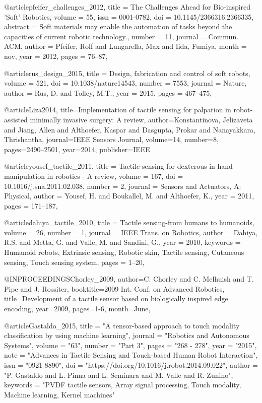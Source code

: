 @article{pfeifer_challenges_2012,
	title = {The {Challenges} {Ahead} for {Bio}-inspired '{Soft}' {Robotics}},
	volume = {55},
	issn = {0001-0782},
	doi = {10.1145/2366316.2366335},
	abstract = {Soft materials may enable the automation of tasks beyond the capacities of current robotic technology.},
	number = {11},
	journal = {Commun. ACM},
	author = {Pfeifer, Rolf and Lungarella, Max and Iida, Fumiya},
	month = nov,
	year = {2012},
	pages = {76--87},
}


@article{rus_design_2015,
	title = {Design, fabrication and control of soft robots},
	volume = {521},
	doi = {10.1038/nature14543},
	number = {7553},
	journal = {Nature},
	author = {Rus, D. and Tolley, M.T.},
	year = {2015},
	pages = {467--475},
}

@article{Liza2014,
  title={Implementation of tactile sensing for palpation in robot-assisted minimally invasive surgery: A review},
  author={Konstantinova, Jelizaveta and Jiang, Allen and Althoefer, Kaspar and Dasgupta, Prokar and Nanayakkara, Thrishantha},
  journal={IEEE Sensors Journal},
  volume={14},
  number={8},
  pages={2490--2501},
  year={2014},
  publisher={IEEE}
}


@article{yousef_tactile_2011,
	title = {Tactile sensing for dexterous in-hand manipulation in robotics - {A} review},
	volume = {167},
	doi = {10.1016/j.sna.2011.02.038},
	number = {2},
	journal = {Sensors and Actuators, A: Physical},
	author = {Yousef, H. and Boukallel, M. and Althoefer, K.},
	year = {2011},
	pages = {171--187},
}


@article{dahiya_tactile_2010,
	title = {Tactile sensing-from humans to humanoids},
	volume = {26},
	number = {1},
	journal = {IEEE Trans. on Robotics},
	author = {Dahiya, R.S. and Metta, G. and Valle, M. and Sandini, G.},
	year = {2010},
	keywords = {Humanoid robots, Extrinsic sensing, Robotic skin, Tactile sensing, Cutaneous sensing, Touch sensing system},
	pages = {1--20},
}


@INPROCEEDINGS{Chorley_2009, 
	author={C. Chorley and C. Melhuish and T. Pipe and J. Rossiter}, 
	booktitle={2009 Int. Conf. on Advanced Robotics}, 
	title={Development of a tactile sensor based on biologically inspired edge encoding}, 
	year={2009}, 
	pages={1-6}, 
	month={June},}
 
 @article{Gastaldo_2015,
 	title = "A tensor-based approach to touch modality classification by using machine learning",
 	journal = "Robotics and Autonomous Systems",
 	volume = "63",
 	number = "Part 3",
 	pages = "268 - 278",
 	year = "2015",
 	note = "Advances in Tactile Sensing and Touch-based Human Robot Interaction",
 	issn = "0921-8890",
 	doi = "https://doi.org/10.1016/j.robot.2014.09.022",
 	author = "P. Gastaldo and L. Pinna and L. Seminara and M. Valle and R. Zunino",
 	keywords = "PVDF tactile sensors, Array signal processing, Touch modality, Machine learning, Kernel machines"
 }
 
